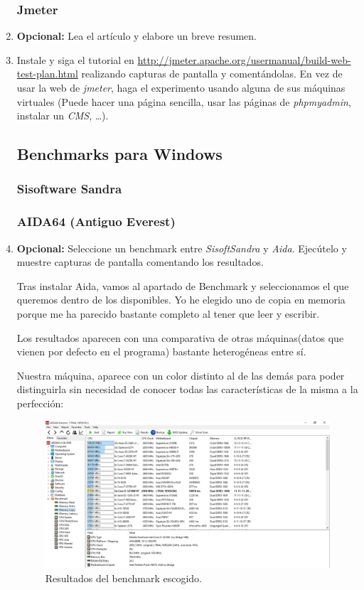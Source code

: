 \documentclass[paper=a4, fontsize=11pt]{scrartcl} %
\numberwithin{equation}{section} %
\numberwithin{figure}{section} %
\numberwithin{table}{section} %
\begin{document}
\begin{enumerate}
	\subsubsection{Jmeter}
		\item \textbf{Opcional:} Lea el artículo y elabore un breve resumen.
		
		\item Instale y siga el tutorial en \url{http://jmeter.apache.org/usermanual/build-web-test-plan.html}
		realizando capturas de pantalla y comentándolas. En vez de usar la web de \textit{jmeter},
		haga el experimento usando alguna de sus máquinas virtuales (Puede hacer una página sencilla,
		usar las páginas de \textit{phpmyadmin}, instalar un \textit{CMS}, \dots).
		
	\subsection{Benchmarks para Windows}
	\subsubsection{Sisoftware Sandra}
	\subsubsection{AIDA64 (Antiguo Everest)}
		\item \textbf{Opcional:} Seleccione un benchmark entre \textit{SisoftSandra} y \textit{Aida}.
		Ejecútelo y muestre capturas de pantalla comentando los resultados.
		
		Tras instalar Aida, vamos al apartado de Benchmark y seleccionamos el que queremos dentro de
		los disponibles. Yo he elegido uno de copia en memoria porque me ha parecido bastante completo
		al tener que leer y escribir.
		
		Los resultados aparecen con una comparativa de otras máquinas(datos que vienen por defecto en
		el programa) bastante heterogéneas entre sí.
		
		Nuestra máquina, aparece con un color distinto al de las demás para poder distinguirla sin
		necesidad de conocer todas las características de la misma a la perfección:
		
		\begin{figure}[H]
			\centering
			\includegraphics[width=15cm]{Ejercicio_8.jpg}
			\caption{Resultados del benchmark escogido.}
			\label{fig:Aida}
		\end{figure}
		

\end{enumerate}
\end{document}
